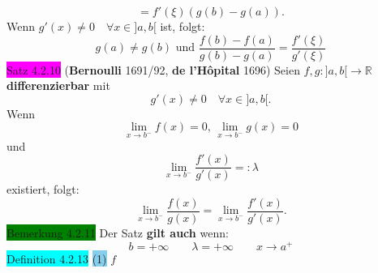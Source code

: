 \documentclass[landscape, 10pt]{article}
\newcommand{\R}{\mathbb{R}}
\begin{document}
\begin{multicols}{3}
\begin{equation*}
                            =f'(\xi)(g(b)-g(a)).
                     \end{equation*} 
                     Wenn \textcolor{NavyBlue}{
                     $g'(x)\neq0\quad\forall x\in]a,b[$} 
                     ist, folgt: 
                     \begin{equation*}
                            g(a)\neq g(b)
                            \text{ und }
                            \frac{f(b)-f(a)}{g(b)-g(a)}
                            =\frac{f'(\xi)}{g'(\xi)}
                     \end{equation*}
              \colorbox{magenta}{Satz 4.2.10} 
              (\textbf{Bernoulli} 1691/92, 
              \textbf{de l'Hôpital} 1696) 
                     Seien \textcolor{NavyBlue}{
                     $f,g:]a,b[\longrightarrow\R$} 
                     \textbf{differenzierbar} mit 
                     \begin{equation*}
                           g'(x)\neq0\quad\forall x\in]a,b[.
                     \end{equation*}
                     Wenn 
                     \begin{equation*}
                            \lim\limits_{x\to b^{-}}f(x)=0,\,
                            \lim\limits_{x\to b^{-}}g(x)=0   
                     \end{equation*}
                     und 
                     \begin{equation*}
                            \lim\limits_{x\to b^{-}}
                            \frac{f'(x)}{g'(x)}=:\lambda
                     \end{equation*}
                     existiert, folgt: 
                     \begin{equation*}
                            \lim\limits_{x\to b^{-}}
                            \frac{f(x)}{g(x)}
                            =\lim\limits_{x\to b^{-}}
                            \frac{f'(x)}{g'(x)}.
                     \end{equation*}
              \colorbox{green}{Bemerkung 4.2.11} 
                     Der Satz \textbf{gilt auch} wenn:
                     \begin{equation*}
                            b=+\infty\qquad\lambda
                            =+\infty\qquad x\to a^{+}
                     \end{equation*}
              \colorbox{cyan}{Definition 4.2.13} 
                     \colorbox{SkyBlue}{(1)} 
                            \textcolor{NavyBlue}{$f$}

\end{multicols}
\end{document}
